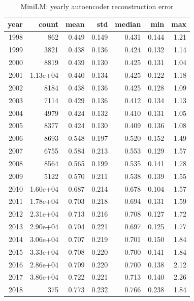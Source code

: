 \begin{table}[ht]
\centering
\caption{MiniLM: yearly autoencoder reconstruction error}
\label{tab:minilm_ae_all_years}
\begin{tabular}{rrrrrrr}
\toprule
year & count & mean & std & median & min & max \\
\midrule
1998 & 862 & 0.449 & 0.149 & 0.431 & 0.144 & 1.21 \\
1999 & 3821 & 0.438 & 0.136 & 0.424 & 0.132 & 1.14 \\
2000 & 8819 & 0.439 & 0.130 & 0.425 & 0.131 & 1.04 \\
2001 & 1.13e+04 & 0.440 & 0.134 & 0.425 & 0.122 & 1.18 \\
2002 & 8184 & 0.438 & 0.136 & 0.425 & 0.128 & 1.09 \\
2003 & 7114 & 0.429 & 0.136 & 0.412 & 0.134 & 1.13 \\
2004 & 4979 & 0.424 & 0.132 & 0.410 & 0.131 & 1.05 \\
2005 & 8377 & 0.424 & 0.130 & 0.409 & 0.136 & 1.08 \\
2006 & 8693 & 0.548 & 0.197 & 0.520 & 0.152 & 1.49 \\
2007 & 6755 & 0.584 & 0.213 & 0.553 & 0.129 & 1.57 \\
2008 & 8564 & 0.565 & 0.199 & 0.535 & 0.141 & 1.78 \\
2009 & 5122 & 0.570 & 0.211 & 0.538 & 0.139 & 1.55 \\
2010 & 1.60e+04 & 0.687 & 0.214 & 0.678 & 0.104 & 1.57 \\
2011 & 1.78e+04 & 0.703 & 0.218 & 0.694 & 0.131 & 1.59 \\
2012 & 2.31e+04 & 0.713 & 0.216 & 0.708 & 0.127 & 1.72 \\
2013 & 2.90e+04 & 0.704 & 0.221 & 0.697 & 0.125 & 1.77 \\
2014 & 3.06e+04 & 0.707 & 0.219 & 0.701 & 0.150 & 1.84 \\
2015 & 3.33e+04 & 0.708 & 0.220 & 0.700 & 0.141 & 1.84 \\
2016 & 2.86e+04 & 0.709 & 0.220 & 0.700 & 0.138 & 2.12 \\
2017 & 3.86e+04 & 0.722 & 0.221 & 0.713 & 0.140 & 2.26 \\
2018 & 375 & 0.773 & 0.232 & 0.766 & 0.238 & 1.84 \\
\bottomrule
\end{tabular}
\end{table}

